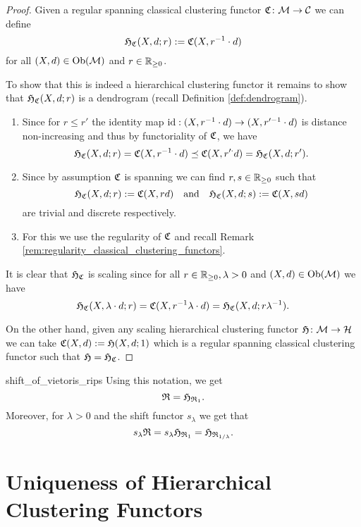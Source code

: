 \begin{proof}
Given a regular spanning classical clustering functor $\mathfrak{C}\colon \mathcal{M} \to \mathcal{C}$ we can define
$$
\mathfrak{H}_{\mathfrak{C}}(X,d; r) := \mathfrak{C}(X, r^{-1} \cdot d)
$$
for all $(X,d) \in \mathrm {Ob}(\mathcal{M})$ and $r \in \mathbb R_{\geq0}$.

To show that this is indeed a hierarchical clustering functor it remains to show that $\mathfrak{H}_{\mathfrak{C}}(X,d;r)$ is a dendrogram (recall Definition \ref{def:dendrogram}).
\begin{enumerate}
    \item Since for $r \leq r'$ the identity map $\mathrm{id}: (X, r^{-1} \cdot d) \to (X, r'^{-1} \cdot d)$ is distance non-increasing and thus by functoriality of $\mathfrak{C}$, we have
    $$
    \mathfrak{H}_{\mathfrak{C}}(X,d;r) = \mathfrak{C}(X, r^{-1} \cdot d) \preceq \mathfrak{C}(X, r'^ \cdot d) = \mathfrak{H}_{\mathfrak{C}}(X,d;r').
    $$
    
    \item Since by assumption $\mathfrak{C}$ is spanning we can find $r,s \in \mathbb R_{\geq0}$ such that
    $$
    \mathfrak{H}_{\mathfrak{C}}(X,d;r) := \mathfrak{C}(X, r d) \quad \text{and} \quad \mathfrak{H}_{\mathfrak{C}}(X,d;s) := \mathfrak{C}(X, s d)
    $$
    are trivial and discrete respectively.

    \item For this we use the regularity of $\mathfrak{C}$ and recall Remark \ref{rem:regularity_classical_clustering_functors}.
\end{enumerate}

It is clear that $\mathfrak{H}_{\mathfrak{C}}$ is scaling since for all $r \in \mathbb R_{\geq0},\lambda > 0$ and $(X,d) \in \mathrm {Ob}(\mathcal{M})$ we have
$$
\mathfrak{H}_{\mathfrak{C}}(X, \lambda \cdot d; r) = \mathfrak{C}(X, r^{-1} \lambda \cdot d) = \mathfrak{H}_{\mathfrak{C}}(X,d;r \lambda^{-1}).
$$ 

On the other hand, given any scaling hierarchical clustering functor $\mathfrak{H}\colon \mathcal{M} \to \mathcal{H}$ we can take $\mathfrak{C}(X,d) := \mathfrak{H}(X,d; 1)$ which is a regular spanning classical clustering functor such that $\mathfrak{H} = \mathfrak{H}_{\mathfrak{C}}$.
\end{proof}

\begin{example}{}{shift_of_vietoris_rips}
Using this notation, we get
$$
\mathfrak{R} = \mathfrak{H}_{\mathfrak{R}_1}.
$$
Moreover, for $\lambda > 0$ and the shift functor $s_\lambda$ we get that
$$
s_\lambda \mathfrak{R} = s_\lambda \mathfrak{H}_{\mathfrak{R}_1} = \mathfrak{H}_{\mathfrak{R}_{1/\lambda}}.
$$
\end{example}

\section{Uniqueness of Hierarchical Clustering Functors}

